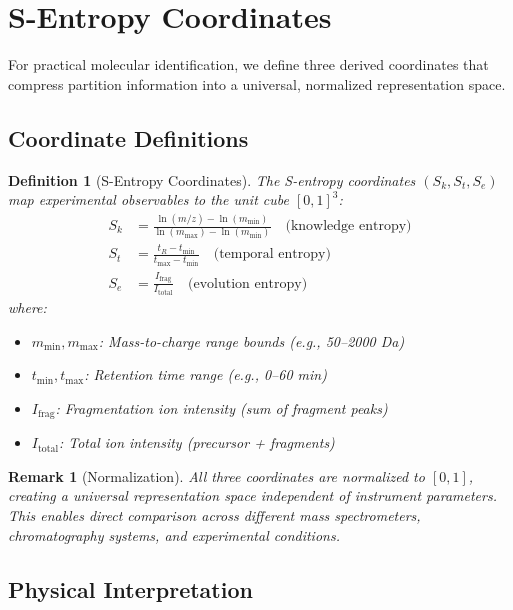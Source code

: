 \documentclass[twocolumn,10pt]{article}
\newtheorem{definition}[theorem]{Definition}
\newtheorem{remark}[theorem]{Remark}
\begin{document}
\section{S-Entropy Coordinates}
\label{sec:sentropy}

For practical molecular identification, we define three derived coordinates that compress partition information into a universal, normalized representation space.

\subsection{Coordinate Definitions}

\begin{definition}[S-Entropy Coordinates]
\label{def:sentropy}
The \emph{S-entropy coordinates} $(S_k, S_t, S_e)$ map experimental observables to the unit cube $[0,1]^3$:
\begin{align}
S_k &= \frac{\ln(m/z) - \ln(m_{\min})}{\ln(m_{\max}) - \ln(m_{\min})} \quad \text{(knowledge entropy)} \\
S_t &= \frac{t_R - t_{\min}}{t_{\max} - t_{\min}} \quad \text{(temporal entropy)} \\
S_e &= \frac{I_{\mathrm{frag}}}{I_{\mathrm{total}}} \quad \text{(evolution entropy)}
\end{align}
where:
\begin{itemize}
    \item $m_{\min}, m_{\max}$: Mass-to-charge range bounds (e.g., 50–2000 Da)
    \item $t_{\min}, t_{\max}$: Retention time range (e.g., 0–60 min)
    \item $I_{\mathrm{frag}}$: Fragmentation ion intensity (sum of fragment peaks)
    \item $I_{\mathrm{total}}$: Total ion intensity (precursor + fragments)
\end{itemize}
\end{definition}

\begin{remark}[Normalization]
All three coordinates are normalized to $[0, 1]$, creating a universal representation space independent of instrument parameters. This enables direct comparison across different mass spectrometers, chromatography systems, and experimental conditions.
\end{remark}

\subsection{Physical Interpretation}
\end{document}
